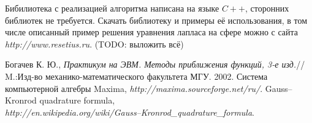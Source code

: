 \documentclass[a4paper]{article}
\begin{document}
Бибилиотека с реализацией алгоритма написана на языке $C++$,
сторонних библиотек не требуется. Скачать библиотеку и примеры её
использования, в том числе описанный пример решения уравнения лапласа на сфере можно с
сайта {\it http://www.resetius.ru}. (TODO: выложить всё)

\begin{thebibliography}{999}
 Богачев К. Ю., {\it  Практикум на ЭВМ.  Методы
    приближения функций, 3-е изд.}// M.:Изд-во
  механико-математического факультета МГУ. 2002.
 Система компьютерной алгебры Maxima, {\it http://maxima.sourceforge.net/ru/}.
Gauss–Kronrod quadrature formula, \\ {\it
  http://en.wikipedia.org/wiki/Gauss–Kronrod\_quadrature\_formula}. 
\end{thebibliography}
\end{document}
